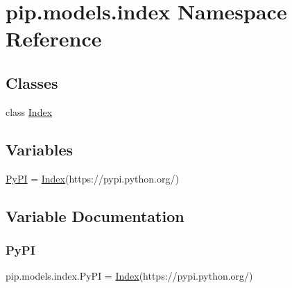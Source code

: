 \hypertarget{namespacepip_1_1models_1_1index}{}\section{pip.\+models.\+index Namespace Reference}
\label{namespacepip_1_1models_1_1index}
\subsection*{Classes}
\begin{DoxyCompactItemize}
\item 
class \hyperlink{classpip_1_1models_1_1index_1_1_index}{Index}
\end{DoxyCompactItemize}
\subsection*{Variables}
\begin{DoxyCompactItemize}
\item 
\hyperlink{namespacepip_1_1models_1_1index_a598e48836aa5947cf2a4767058292208}{Py\+PI} = \hyperlink{classpip_1_1models_1_1index_1_1_index}{Index}(\textquotesingle{}https\+://pypi.\+python.\+org/\textquotesingle{})
\end{DoxyCompactItemize}


\subsection{Variable Documentation}
\mbox{\label{namespacepip_1_1models_1_1index_a598e48836aa5947cf2a4767058292208}} 
\subsubsection{\texorpdfstring{Py\+PI}{PyPI}}
{\footnotesize\ttfamily pip.\+models.\+index.\+Py\+PI = \hyperlink{classpip_1_1models_1_1index_1_1_index}{Index}(\textquotesingle{}https\+://pypi.\+python.\+org/\textquotesingle{})}

